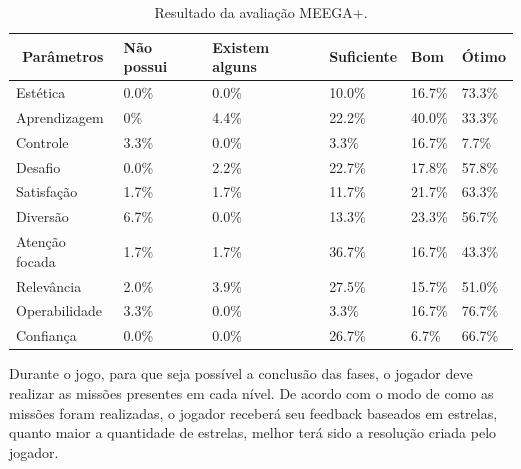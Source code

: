 \documentclass[10pt, conference, compsocconf]{IEEEtran}
\begin{document}
\begin{table}[ht]
	\caption{Resultado da avaliação MEEGA+.}
	\begin{center}
		\begin{tabular}{|p{1.6cm}|p{.9cm}|p{.9cm}|p{.9cm}|p{.9cm}|p{.9cm}|}
			\hline
			\multicolumn{1}{|c|}{\textbf{Parâmetros}} & \textbf{Não possui
			} & \textbf{Existem alguns} & \textbf{Suficiente} & \textbf{Bom} & \textbf{Ótimo} \\ \hline
			
			Estética 
			& 0.0\% & 0.0\%    & 10.0\%     & 16.7\%   & 73.3\% \\ \hline
			
			Aprendizagem 
			& 0\% & 4.4\% & 22.2\% & 40.0\%  & 33.3\% \\ \hline
			
			Controle
			& 3.3\%   & 0.0\%   & 3.3\%    & 16.7\%  & 7.7\% \\ \hline
			
			Desafio 
			& 0.0\% & 2.2\% & 22.7\% & 17.8\%  & 57.8\% \\ \hline
			
			Satisfação 
			& 1.7\% & 1.7\% & 11.7\% & 21.7\% & 63.3\% \\ \hline
			
			Diversão 
			& 6.7\% & 0.0\% & 13.3\% & 23.3\%  & 56.7\% \\ \hline
			
			Atenção focada
			& 1.7\% & 1.7\% & 36.7\% & 16.7\%  & 43.3\% \\ \hline
			
			Relevância 
			& 2.0\% & 3.9\% & 27.5\% & 15.7\%  & 51.0\% \\ \hline
			
			Operabilidade 
			& 3.3\% & 0.0\% & 3.3\% & 16.7\%  & 76.7\% \\ \hline
			
			Confiança 
			& 0.0\% & 0.0\% & 26.7\% & 6.7\%  & 66.7\% \\ \hline
		\end{tabular}
	\end{center}
	\label{Tab6}
\end{table}


Durante o jogo, para que seja possível a conclusão das fases, o jogador deve realizar as missões presentes em cada nível. De acordo com o modo de como as missões foram realizadas, o jogador receberá seu feedback baseados em estrelas, quanto maior a quantidade de estrelas, melhor terá sido a resolução criada pelo jogador.
	
\end{document}
